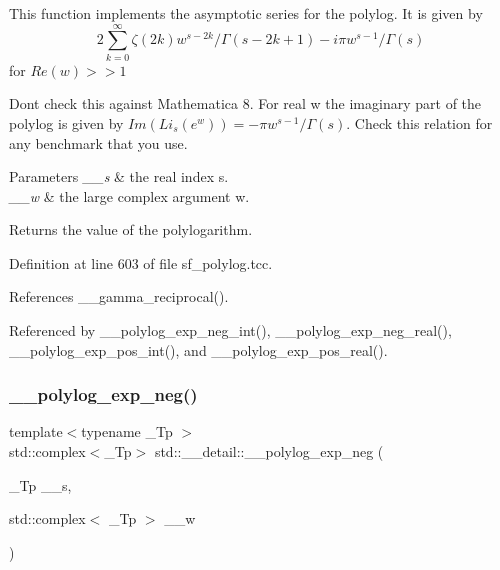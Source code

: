 This function implements the asymptotic series for the polylog. It is given by \[ 2 \sum_{k=0}^{\infty} \zeta(2k) w^{s-2k}/\Gamma(s-2k+1) -i \pi w^{s-1}/\Gamma(s) \] for $ Re(w) >> 1 $

Don\textquotesingle{}t check this against Mathematica 8. For real w the imaginary part of the polylog is given by $ Im(Li_s(e^w)) = -\pi w^{s-1}/\Gamma(s) $. Check this relation for any benchmark that you use.


\begin{DoxyParams}{Parameters}
{\em \+\_\+\+\_\+s} & the real index s. \\
\hline
{\em \+\_\+\+\_\+w} & the large complex argument w. \\
\hline
\end{DoxyParams}
\begin{DoxyReturn}{Returns}
the value of the polylogarithm. 
\end{DoxyReturn}


Definition at line 603 of file sf\+\_\+polylog.\+tcc.



References \+\_\+\+\_\+gamma\+\_\+reciprocal().



Referenced by \+\_\+\+\_\+polylog\+\_\+exp\+\_\+neg\+\_\+int(), \+\_\+\+\_\+polylog\+\_\+exp\+\_\+neg\+\_\+real(), \+\_\+\+\_\+polylog\+\_\+exp\+\_\+pos\+\_\+int(), and \+\_\+\+\_\+polylog\+\_\+exp\+\_\+pos\+\_\+real().

\mbox{\label{namespacestd_1_1____detail_a07b26b8c7ff467310e4e1df6e3efd893}} 
\subsubsection{\texorpdfstring{\+\_\+\+\_\+polylog\+\_\+exp\+\_\+neg()}{\_\_polylog\_exp\_neg()}\hspace{0.1cm}{\footnotesize\ttfamily [1/2]}}
{\footnotesize\ttfamily template$<$typename \+\_\+\+Tp $>$ \\
std\+::complex$<$\+\_\+\+Tp$>$ std\+::\+\_\+\+\_\+detail\+::\+\_\+\+\_\+polylog\+\_\+exp\+\_\+neg (\begin{DoxyParamCaption}\item[{\+\_\+\+Tp}]{\+\_\+\+\_\+s,  }\item[{std\+::complex$<$ \+\_\+\+Tp $>$}]{\+\_\+\+\_\+w }\end{DoxyParamCaption})}

